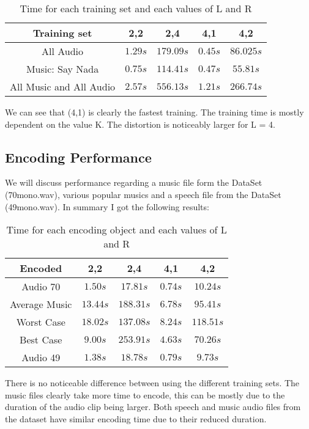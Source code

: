 \documentclass[a4paper, 11pt]{article}
\begin{document}
			\begin{table}[H]
				\centering
				\begin{tabular}{c|c|c|c|c}
					\textbf{Training set}	 	& \textbf{2,2} & \textbf{2,4}	& \textbf{4,1} & \textbf{4,2}\\ \hline
					All Audio 					& $ 1.29 s $ 	& $ 179.09 s $	& $ 0.45 s $ 	& $ 86.02 5 s $	\\ \hline
					Music: Say Nada				& $ 0.75 s $	& $ 114.41 s $	& $ 0.47 s $ 	& $ 55.81 s $	\\ \hline
					All Music and All Audio 	& $ 2.57 s $	& $	556.13 s $	& $ 1.21 s $	& $	266.74 s $	\\
				\end{tabular}
				\caption{Time for each training set and each values of L and R}
				\label{table:TrainTime}
			\end{table}
		
			We can see that (4,1) is clearly the fastest training.
			The training time is mostly dependent on the value K.
			The distortion is noticeably larger for L = 4.
			
		\subsection{Encoding Performance}
			We will discuss performance regarding a music file form the DataSet (70mono.wav), various popular musics and a speech file from the DataSet (49mono.wav).
			In summary I got the following results:
			
			\begin{table}[H]
				\centering
				\begin{tabular}{c|c|c|c|c}
					\textbf{Encoded}	& \textbf{2,2} 	& \textbf{2,4}	& \textbf{4,1} & \textbf{4,2}\\ \hline
					Audio 70				& $ 1.50 s $ 	& $ 17.81 s $	& $ 0.74 s $ 	& $ 10.24 s $	\\ \hline
					Average Music			& $ 13.44 s $	& $ 188.31 s $	& $ 6.78 s $ 	& $ 95.41 s $	\\ \hline	
					Worst Case				& $ 18.02 s $	& $	137.08 s $	& $ 8.24 s $	& $	118.51 s $	\\ \hline
					Best Case				& $ 9.00 s $	& $	253.91 s $	& $ 4.63 s $	& $	70.26 s $	\\ \hline
					Audio 49				& $ 1.38 s $	& $	18.78 s $	& $ 0.79 s $	& $	9.73 s $	\\
				\end{tabular}
				\caption{Time for each encoding object and each values of L and R}
				\label{table:EncodeTime}
			\end{table}
			There is no noticeable difference between using the different training sets.
			The music files clearly take more time to encode, this can be mostly due to the duration of the audio clip being larger.
			Both speech and music audio files from the dataset have similar encoding time due to their reduced duration.
			
\end{document}
